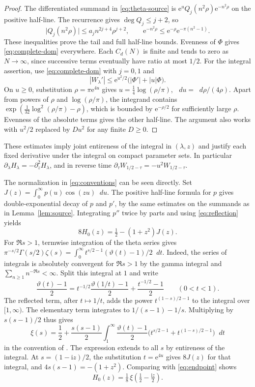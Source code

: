 \documentclass[11pt]{article}
\newcommand{\dd}{\mathop{}\!d}
\newcommand{\ee}{\mathrm e}
\newcommand{\ii}{\mathrm i}
\newcommand{\abs}[1]{\lvert#1\rvert}
\begin{document}
\begin{proof}
The differentiated summand in \eqref{eq:theta-source} is
\(\ee^u Q_j(n^2\rho)\ee^{-n^2\rho}\) on the positive half-line.
The recurrence gives \(\deg Q_j\le j+2\), so
\[
 \abs{Q_j(n^2\rho)}\le a_j n^{2j+4}\rho^{j+2},\qquad
 \ee^{-n^2\rho}\le\ee^{-\rho}\ee^{-\pi(n^2-1)}.
\]
These inequalities prove the tail and full half-line bounds.
Evenness of \(\Phi\) gives \eqref{eq:complete-dom} everywhere.
Each \(C_d(N)\) is finite and tends to zero as \(N\to\infty\),
since successive terms eventually have ratio at most \(1/2\).
For the integral assertion, use \eqref{eq:complete-dom} with
\(j=0,1\) and
\[
 |W_\lambda'|\le \ee^{u^2/2}\bigl(|\Phi'|+|u|\Phi\bigr).
\]
On \(u\ge0\), substitution \(\rho=\pi\ee^{4u}\) gives
\(u=\tfrac14\log(\rho/\pi)\), \(\dd u=\dd\rho/(4\rho)\).
Apart from powers of \(\rho\) and \(\log(\rho/\pi)\), the integrand
contains \(\exp(\tfrac1{32}\log^2(\rho/\pi)-\rho)\), which is
bounded by \(\ee^{-\rho/2}\) for sufficiently large \(\rho\).
Evenness of the absolute terms gives the other half-line.
The argument also works with \(u^2/2\) replaced by \(D u^2\) for
any finite \(D\ge0\).
\end{proof}

These estimates imply joint entireness of the integral in
\((\lambda,z)\) and justify each fixed derivative under the integral
on compact parameter sets. In particular
\(\partial_\lambda H_\lambda=-\partial_z^2H_\lambda\), and in reverse
time \(\partial_\tau W_{1/2-\tau}=-u^2W_{1/2-\tau}\).

The normalization in \eqref{eq:conventions} can be seen directly.
Set \(J(z)=\int_0^\infty p(u)\cos(zu)\dd u\). The positive
half-line formula for \(p\) gives double-exponential decay of
\(p\) and \(p'\), by the same estimates on the summands as in
Lemma~\ref{lem:source}. Integrating \(p''\) twice by parts and
using \eqref{eq:reflection} yields
\begin{equation}\label{eq:endpoint}
 8H_0(z)=\tfrac12-(1+z^2)J(z).
\end{equation}
For \(\Re s>1\), termwise integration of the theta series gives
\(\pi^{-s/2}\Gamma(s/2)\zeta(s)
 =\int_0^\infty t^{s/2-1}(\vartheta(t)-1)/2\dd t\).
Indeed, the series of integrals is absolutely convergent for
\(\Re s>1\) by the gamma integral and \(\sum_{n\ge1}n^{-\Re s}<\infty\).
Split this integral at \(1\) and write
\[
 \frac{\vartheta(t)-1}{2}
   =t^{-1/2}\frac{\vartheta(1/t)-1}{2}+\frac{t^{-1/2}-1}{2}
 \qquad (0<t<1).
\]
The reflected term, after \(t\mapsto 1/t\), adds the power
\(t^{(1-s)/2-1}\) to the integral over \([1,\infty)\).
The elementary term integrates to \(1/(s-1)-1/s\).
Multiplying by \(s(s-1)/2\) thus gives
\[
 \xi(s)=\frac12+\frac{s(s-1)}2\int_1^\infty
  \frac{\vartheta(t)-1}{2}\bigl(t^{s/2-1}+t^{(1-s)/2-1}\bigr)\dd t
\]
in the convention of \cite[25.4.4]{DLMFZeta}. The expression extends
to all \(s\) by entireness of the integral. At \(s=(1-\ii z)/2\),
the substitution \(t=\ee^{4u}\) gives \(8J(z)\) for that integral,
and \(4s(s-1)=-(1+z^2)\). Comparing with \eqref{eq:endpoint} shows
\begin{equation}\label{eq:xi}
 H_0(z)=\tfrac18\,\xi(\tfrac12-\tfrac{\ii z}2).
\end{equation}
\end{document}
